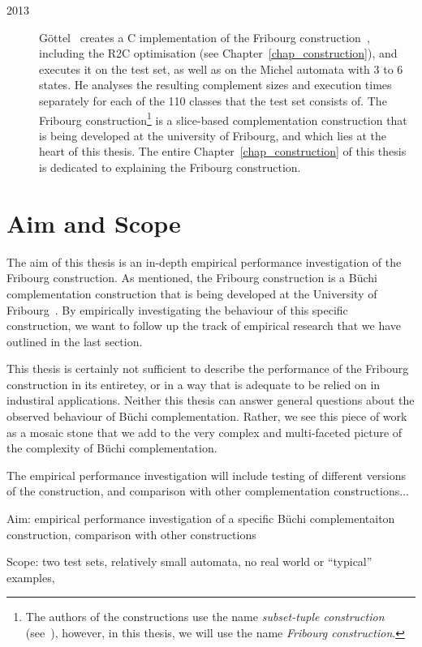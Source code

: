 \begin{description}
\item[2013] Göttel~\cite{2013_bsc_goettel} creates a C implementation of the Fribourg construction~\cite{2014_joel_ulrich}, including the R2C optimisation (see Chapter~\ref{chap_construction}), and executes it on the \goal{} test set, as well as on the Michel automata with 3 to 6 states. He analyses the resulting complement sizes and execution times separately for each of the 110 classes that the \goal{} test set consists of. The Fribourg construction\footnote{The authors of the constructions use the name \textit{subset-tuple construction} (see~\cite{2014_joel_ulrich}), however, in this thesis, we will use the name \textit{Fribourg construction}.} is a slice-based complementation construction that is being developed at the university of Fribourg, and which lies at the heart of this thesis. The entire Chapter~\ref{chap_construction} of this thesis is dedicated to explaining the Fribourg construction.
\end{description}


\section{Aim and Scope}
The aim of this thesis is an in-depth empirical performance investigation of the Fribourg construction. As mentioned, the Fribourg construction is a Büchi complementation construction that is being developed at the University of Fribourg~\cite{2014_joel_ulrich}. By empirically investigating the behaviour of this specific construction, we want to follow up the track of empirical research that we have outlined in the last section.

This thesis is certainly not sufficient to describe the performance of the Fribourg construction in its entiretey, or in a way that is adequate to be relied on in industiral applications. Neither this thesis can answer general questions about the observed behaviour of Büchi complementation. Rather, we see this piece of work as a mosaic stone that we add to the very complex and multi-faceted picture of the complexity of Büchi complementation.

The empirical performance investigation will include testing of different versions of the construction, and comparison with other complementation constructions...


Aim: empirical performance investigation of a specific Büchi complementaiton construction, comparison with other constructions

Scope: two test sets, relatively small automata, no real world or ``typical'' examples,

